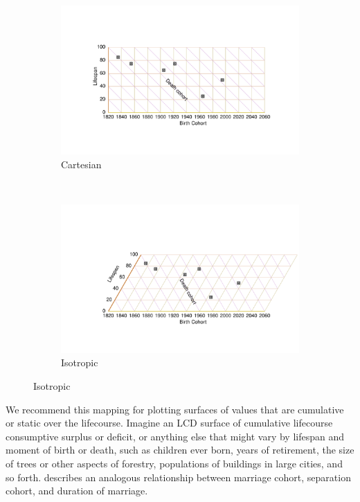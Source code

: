 \documentclass[12pt,oneside,a4paper]{article} %
\begin{document}
\begin{figure}[h!] 
\caption{An LCD diagram in two projections.}
\label{fig:LCD}
\centering
\begin{subfigure}{1.1\textwidth}
\caption{Cartesian}
\vspace{-5em}
\label{fig:LCDrt}
\includegraphics[scale=0.8]{Figures/LCDrt.pdf}
\end{subfigure}
\\\vspace{-2em}
\begin{subfigure}{1.1\textwidth}
\caption{Isotropic}
\vspace{-6em}
\label{fig:LCDeq}
\includegraphics[scale=0.8]{Figures/LCDeq.pdf}
\end{subfigure}
\end{figure} 

We
recommend this mapping for plotting surfaces of values that are cumulative or
static over the lifecourse. Imagine an LCD surface of cumulative lifecourse
consumptive surplus or deficit, or anything else that might vary by lifespan and
moment of birth or death, such as children ever born, years of retirement, the
size of trees or other aspects of forestry, populations of buildings in large
cities, and so forth. \citet{lexis1875einleitung} describes an analogous
relationship between marriage cohort, separation cohort, and duration of
marriage.
\end{document}

